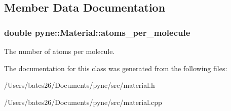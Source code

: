 \subsection{Member Data Documentation}
\hypertarget{classpyne_1_1_material_a7ddff1aaebc94bcda22d3422c093a756}{
\subsubsection[{atoms\+\_\+per\+\_\+molecule}]{\setlength{\rightskip}{0pt plus 5cm}double pyne\+::\+Material\+::atoms\+\_\+per\+\_\+molecule}}\label{classpyne_1_1_material_a7ddff1aaebc94bcda22d3422c093a756}
The number of atoms per molecule. 

The documentation for this class was generated from the following files\+:\begin{DoxyCompactItemize}
\item 
/\+Users/bates26/\+Documents/pyne/src/material.\+h\item 
/\+Users/bates26/\+Documents/pyne/src/material.\+cpp\end{DoxyCompactItemize}
